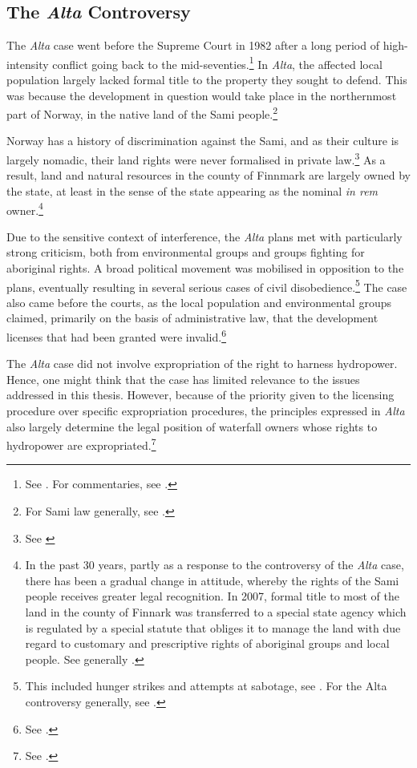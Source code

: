 \subsection{The {\it Alta} Controversy}\label{sec:alta}

The {\it Alta} case went before the Supreme Court in 1982 after a long period of high-intensity conflict going back to the mid-seventies.\footnote{See \cite{alta82}. For commentaries, see \cite{eckhoff82,boe83,hagvar88}.} In {\it Alta}, the affected local population largely lacked formal title to the property they sought to defend. This was because the development in question would take place in the northernmost part of Norway, in the native land of the Sami people.\footnote{For Sami law generally, see \cite{skogvang02}.}

Norway has a history of discrimination against the Sami, and as their culture is largely nomadic, their land rights were never formalised in private law.\footnote{See \cite[149-156]{ravna12s}} As a result, land and natural resources in the county of Finnmark are largely owned by the state, at least in the sense of the state appearing as the nominal {\it in rem} owner.\footnote{In the past 30 years, partly as a response to the controversy of the {\it Alta} case, there has been a gradual change in attitude, whereby the rights of the Sami people receives greater legal recognition. In 2007, formal title to most of the land in the county of Finnark was transferred to a special state agency which is regulated by a special statute that obliges it to manage the land with due regard to customary and prescriptive rights of aboriginal groups and local people. See generally \cite{bull07}.}

Due to the sensitive context of interference, the {\it Alta} plans met with particularly strong criticism, both from environmental groups and groups fighting for aboriginal rights. A broad political movement was mobilised in opposition to the plans, eventually resulting in several serious cases of civil disobedience.\footnote{This included hunger strikes and attempts at sabotage, see \cite[80-83]{nilsen08}. For the Alta controversy generally, see \cite{altawiki,hjorthol06}.} The case also came before the courts, as the local population and environmental groups claimed, primarily on the basis of administrative law, that the development licenses that had been granted were invalid.\footnote{See \cite{eckhoff82}.}

The {\it Alta} case did not involve expropriation of the right to harness hydropower. Hence, one might think that the case has limited relevance to the issues addressed in this thesis. However, because of the priority given to the licensing procedure over specific expropriation procedures, the principles expressed in {\it Alta} also largely determine the legal position of waterfall owners whose rights to hydropower are expropriated.\footnote{See \cite{sauda09,jorpeland11}.}


